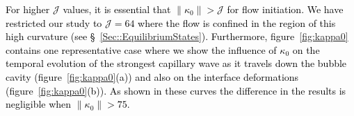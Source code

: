 \documentclass[final]{jfm}
\newcommand*\red{\textcolor{black}}
\begin{document}
\red{For higher $\mathcal{J}$ values, it is essential that $\|\kappa_0\| > \mathcal{J}$ for flow initiation. We have restricted our study to $\mathcal{J} = 64$ where the flow is confined in the region of this high curvature (see \S~\ref{Sec::EquilibriumStates}). Furthermore, figure~\ref{fig:kappa0} contains one representative case where we show the influence of $\kappa_0$ on the temporal evolution of the strongest capillary wave as it travels down the bubble cavity (figure~\ref{fig:kappa0}(a)) and also on the interface deformations (figure~\ref{fig:kappa0}(b)). As shown in these curves the difference in the results is negligible when $\|\kappa_0\| > 75$.}



\end{document}
